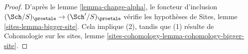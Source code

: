 \begin{proof}
D'après le lemme \ref{lemma-change-alpha}, le foncteur d'inclusion
$(\Sch/S)_\proetale \to (\Sch'/S)_\proetale$ vérifie les hypothèses de
Sites, lemme \ref{sites-lemma-bigger-site}. Cela implique (2), tandis que (1)
résulte de
Cohomologie sur les sites, lemme \ref{sites-cohomology-lemma-cohomology-bigger-site}.
\end{proof}
















